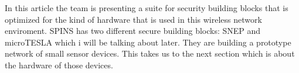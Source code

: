 In this article the team is presenting a suite for security building blocks that is optimized for the kind of hardware that is used in this wireless network enviroment. SPINS has two different secure building blocks: SNEP and microTESLA which i will be talking about later.
They are building a prototype network of small sensor devices. This takes us to the next section which is about the hardware of those devices.